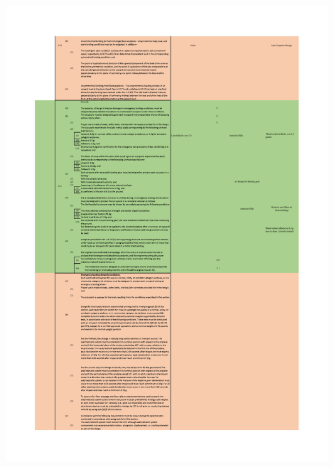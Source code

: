 \begin{table}[H]
\centering
\includegraphics[width=0.9\textwidth]{bilder/Tabellen/MPP_Konstruktion_9.pdf}
\end{table}

